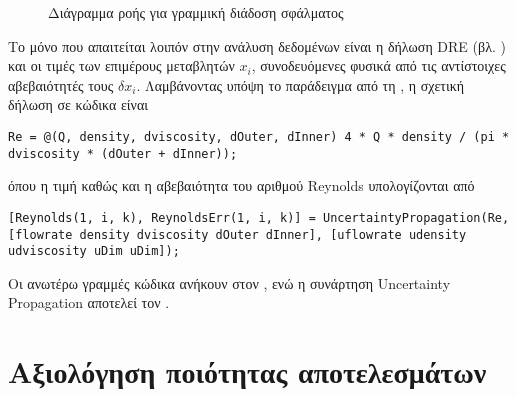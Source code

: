 \begin{figure}[!htbp]
\begin{adjustbox}{width=\textwidth,height=\textheight,keepaspectratio}
\end{adjustbox}
\caption{Διάγραμμα ροής για γραμμική διάδοση σφάλματος}\label{fig:flowchart}
\end{figure}

Το μόνο που απαιτείται λοιπόν στην ανάλυση δεδομένων είναι η δήλωση DRE (βλ. ) και οι τιμές των επιμέρους μεταβλητών $x_i$, συνοδευόμενες φυσικά από τις αντίστοιχες αβεβαιότητές τους $\delta x_i$. Λαμβάνοντας υπόψη το παράδειγμα από τη , η σχετική δήλωση σε κώδικα \matlab είναι

\begin{lstlisting}[firstnumber=238]
% Συνάρτηση υπολογισμού αριθμού Reynolds
Re = @(Q, density, dviscosity, dOuter, dInner) 4 * Q * density / (pi * dviscosity * (dOuter + dInner));
\end{lstlisting}

\noindent όπου η τιμή καθώς και η αβεβαιότητα του αριθμού Reynolds υπολογίζονται από

\begin{lstlisting}[firstnumber=264]
% Reynolds
[Reynolds(1, i, k), ReynoldsErr(1, i, k)] = UncertaintyPropagation(Re, [flowrate density dviscosity dOuter dInner], [uflowrate udensity udviscosity uDim uDim]);
\end{lstlisting}

\noindent Οι ανωτέρω γραμμές κώδικα ανήκουν στον , ενώ η συνάρτηση Uncertainty Propagation αποτελεί τον .


\section{Αξιολόγηση ποιότητας αποτελεσμάτων}

